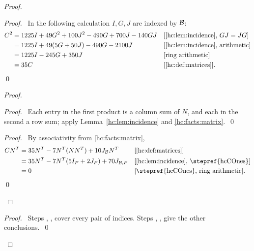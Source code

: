 \begin{mergedproofsection}
\begin{proof}
\begin{proof}
  \pf\ In the following calculation $I,G,J$ are indexed by ${\mathcal B}$:
  \begin{align*}
   C^2&=1225I+49G^2+100J^2-490G+700J-140GJ
     &&\text{[\ref{hc:lem:incidence}, $GJ=JG$]}\\
   &=1225I+49(5G+50J)-490G-2100J
     &&\text{[\ref{hc:lem:incidence}, arithmetic]}\\
   &=1225I-245G+350J &&\text{[ring arithmetic]}\\
   &=35C &&\text{[\ref{hc:def:matrices}].}
  \end{align*}\qed
 \end{proof}
 \begin{proof}
  \begin{proof}\pf\ Each entry in the first product is a column
   sum of $N$, and each in the second a row sum; apply
   Lemma~\ref{hc:lem:incidence} and \ref{hc:facts:matrix}.~\qed\end{proof}
  \qedstep
  \begin{proof}
   \pf\ By associativity from \ref{hc:facts:matrix},
   \begin{align*}
    CN^T&=35N^T-7N^T(NN^T)+10J_{\cB}N^T
      &&\text{[\ref{hc:def:matrices}]}\\
    &=35N^T-7N^T(5I_P+2J_P)+70J_{\cB,P}
      &&\text{[\ref{hc:lem:incidence}, \stepref{hcCOnes}]}\\
    &=0 &&\text{[\stepref{hcCOnes}, ring arithmetic].}
   \end{align*}\qed
  \end{proof}
 \end{proof}
 \qedstep
 \begin{proof}\pf\ Steps , ,
   cover every pair of indices.
  Steps , , 
  give the other conclusions.~\qed\end{proof}
\end{proof}


\end{mergedproofsection}
